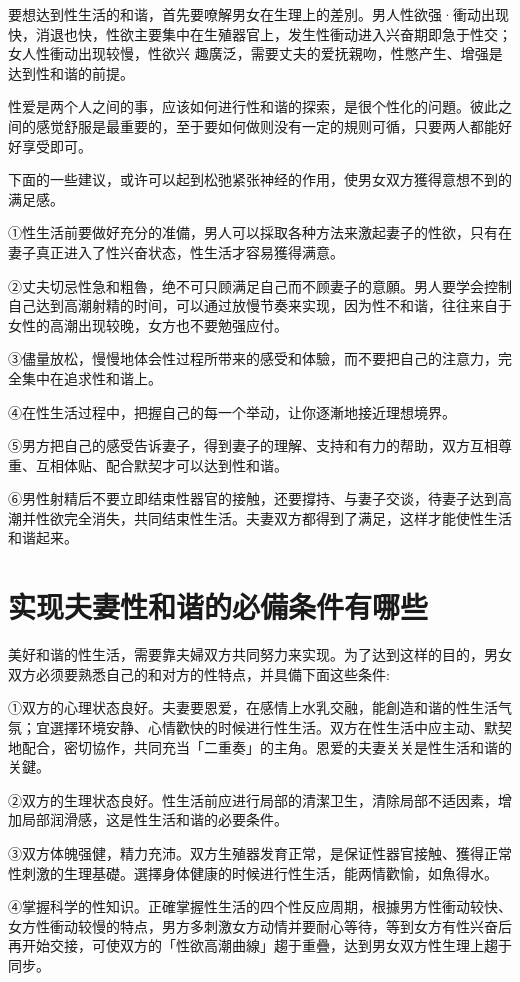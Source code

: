 \documentclass[12pt,UTF8]{ctexbook}
\begin{document}
要想达到性生活的和谐，首先要嘹解男女在生理上的差別。男人性欲强·衝动出现快，消退也快，性欲主要集中在生殖器官上，发生性衝动进入兴奋期即急于性交；女人性衝动出现较慢，性欲兴
趣廣泛，需要丈夫的爱抚親吻，性憋产生、增强是达到性和谐的前提。

性爱是两个人之间的事，应该如何进行性和谐的探索，是很个性化的问題。彼此之间的感觉舒服是最重要的，至于要如何做则没有一定的規则可循，只要两人都能好好享受即可。

下面的一些建议，或许可以起到松弛紧张神经的作用，使男女双方獲得意想不到的满足感。

①性生活前要做好充分的准備，男人可以採取各种方法来激起妻子的性欲，只有在妻子真正进入了性兴奋状态，性生活才容易獲得满意。

②丈夫切忌性急和粗魯，绝不可只顾满足自己而不顾妻子的意願。男人要学会控制自己达到高潮射精的时间，可以通过放慢节奏来实现，因为性不和谐，往往来自于女性的高潮出现较晚，女方也不要勉强应付。

③儘量放松，慢慢地体会性过程所带来的感受和体驗，而不要把自己的注意力，完全集中在追求性和谐上。

④在性生活过程中，把握自己的每一个举动，让你逐漸地接近理想境界。

⑤男方把自己的感受告诉妻子，得到妻子的理解、支持和有力的帮助，双方互相尊重、互相体贴、配合默契才可以达到性和谐。

⑥男性射精后不要立即结束性器官的接触，还要撐持、与妻子交谈，待妻子达到高潮并性欲完全消失，共同结束性生活。夫妻双方都得到了满足，这样才能使性生活和谐起来。

\section{实现夫妻性和谐的必備条件有哪些}

美好和谐的性生活，需要靠夫婦双方共同努力来实现。为了达到这样的目的，男女双方必须要熟悉自己的和对方的性特点，并具備下面这些条件:

①双方的心理状态良好。夫妻要恩爱，在感情上水乳交融，能創造和谐的性生活气氛；宜選擇环境安静、心情歡快的时候进行性生活。双方在性生活中应主动、默契地配合，密切協作，共同充当「二重奏」的主角。恩爱的夫妻关关是性生活和谐的关鍵。

②双方的生理状态良好。性生活前应进行局部的清潔卫生，清除局部不适因素，增加局部润滑感，这是性生活和谐的必要条件。

③双方体魄强健，精力充沛。双方生殖器发育正常，是保证性器官接触、獲得正常性刺激的生理基礎。選擇身体健康的时候进行性生活，能两情歡愉，如魚得水。

④掌握科学的性知识。正確掌握性生活的四个性反应周期，根據男方性衝动较快、女方性衝动较慢的特点，男方多刺激女方动情并要耐心等待，等到女方有性兴奋后再开始交接，可使双方的「性欲高潮曲線」趨于重疊，达到男女双方性生理上趨于同步。
\end{document}
